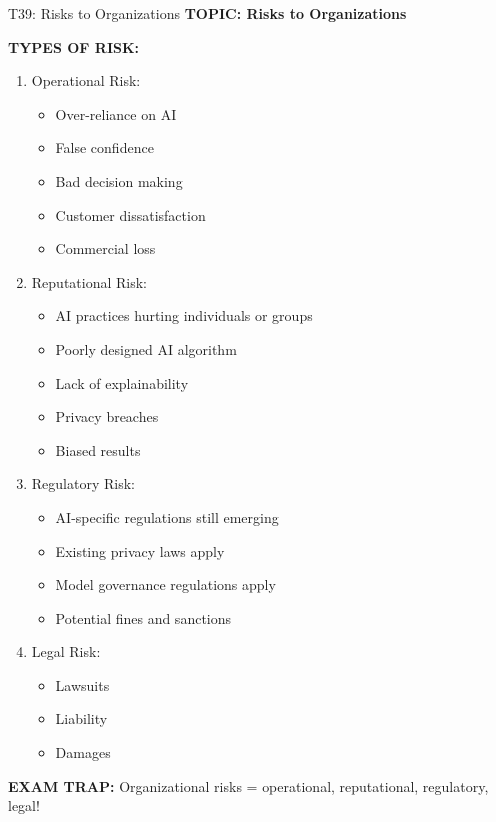 \documentclass[8pt]{beamer}
\begin{document}
	\begin{frame}{T39: Risks to Organizations}
		\fontsize{6.5}{7.5}\selectfont
		\textbf{TOPIC: Risks to Organizations}
		
		\vspace{0.1cm}
		\textbf{TYPES OF RISK:}
		\begin{enumerate}
			\item \textcolor{myblue}{Operational Risk:}
			\begin{itemize}
				\item Over-reliance on AI
				\item False confidence
				\item Bad decision making
				\item Customer dissatisfaction
				\item Commercial loss
			\end{itemize}
			\item \textcolor{myblue}{Reputational Risk:}
			\begin{itemize}
				\item AI practices hurting individuals or groups
				\item Poorly designed AI algorithm
				\item Lack of explainability
				\item Privacy breaches
				\item Biased results
			\end{itemize}
			\item \textcolor{myblue}{Regulatory Risk:}
			\begin{itemize}
				\item AI-specific regulations still emerging
				\item Existing privacy laws apply
				\item Model governance regulations apply
				\item Potential fines and sanctions
			\end{itemize}
			\item \textcolor{myblue}{Legal Risk:}
			\begin{itemize}
				\item Lawsuits
				\item Liability
				\item Damages
			\end{itemize}
		\end{enumerate}
		
		\textcolor{myred}{\textbf{EXAM TRAP:}} Organizational risks = \textcolor{myblue}{operational, reputational, regulatory, legal}!
	\end{frame}
	
\end{document}
